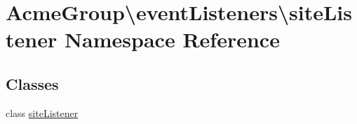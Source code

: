 \hypertarget{namespace_acme_group_1_1event_listeners_1_1site_listener}{\section{Acme\+Group\textbackslash{}event\+Listeners\textbackslash{}site\+Listener Namespace Reference}
\label{namespace_acme_group_1_1event_listeners_1_1site_listener}
}
\subsection*{Classes}
\begin{DoxyCompactItemize}
\item 
class \hyperlink{class_acme_group_1_1event_listeners_1_1site_listener_1_1site_listener}{site\+Listener}
\end{DoxyCompactItemize}
